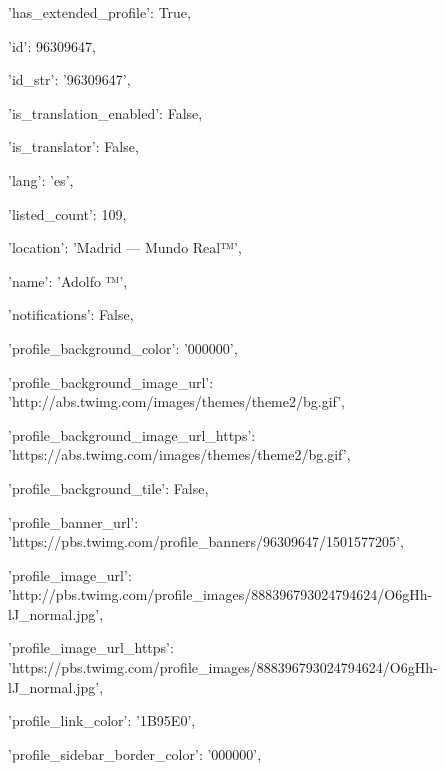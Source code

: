 \hspace{1.7cm}'has\_extended\_profile': True,

\hspace{1.7cm}'id': 96309647,

\hspace{1.7cm}'id\_str': '96309647',

\hspace{1.7cm}'is\_translation\_enabled': False,

\hspace{1.7cm}'is\_translator': False,

\hspace{1.7cm}'lang': 'es',

\hspace{1.7cm}'listed\_count': 109,

\hspace{1.7cm}'location': 'Madrid — Mundo Real™',

\hspace{1.7cm}'name': 'Adolfo ™',

\hspace{1.7cm}'notifications': False,

\hspace{1.7cm}'profile\_background\_color': '000000',

\hspace{1.7cm}'profile\_background\_image\_url': 'http://abs.twimg.com/images/themes/theme2/bg.gif',

\hspace{1.7cm}'profile\_background\_image\_url\_https': 'https://abs.twimg.com/images/themes/theme2/bg.gif',

\hspace{1.7cm}'profile\_background\_tile': False,

\hspace{1.7cm}'profile\_banner\_url': 'https://pbs.twimg.com/profile\_banners/96309647/1501577205',

\hspace{1.7cm}'profile\_image\_url': 'http://pbs.twimg.com/profile\_images/888396793024794624/O6gHh-lJ\_normal.jpg',

\hspace{1.7cm}'profile\_image\_url\_https': 'https://pbs.twimg.com/profile\_images/888396793024794624/O6gHh-lJ\_normal.jpg',

\hspace{1.7cm}'profile\_link\_color': '1B95E0',

\hspace{1.7cm}'profile\_sidebar\_border\_color': '000000',

